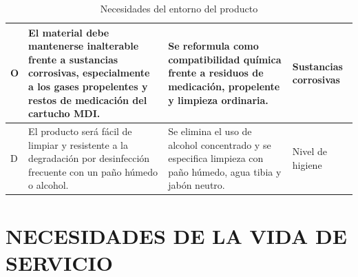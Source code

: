 \documentclass[11pt,a4paper]{article}
\begin{document}
\begin{table}[H]
\begin{tabular}{|p{2.8cm}|p{5.5cm}|p{2.5cm}|p{3.0cm}|}
\hline
O & El material debe mantenerse inalterable frente a sustancias corrosivas, especialmente a los gases propelentes y restos de medicación del cartucho MDI. & Se reformula como compatibilidad química frente a residuos de medicación, propelente y limpieza ordinaria. & Sustancias corrosivas \\
\hline
D & El producto será fácil de limpiar y resistente a la degradación por desinfección frecuente con un paño húmedo o alcohol. & Se elimina el uso de alcohol concentrado y se especifica limpieza con paño húmedo, agua tibia y jabón neutro. & Nivel de higiene \\


\hline
\end{tabular}
\caption{Necesidades del entorno del producto}
\end{table}

\newpage

\section{NECESIDADES DE LA VIDA DE SERVICIO}

\vspace{0.5cm}
\end{document}
